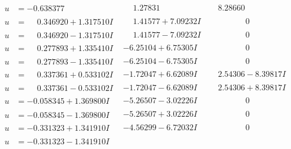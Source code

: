 \documentclass[1p]{elsarticle_modified}
\theoremstyle{definition}
\begin{document}
$$\begin{array}{c|c|c}
 \hline 
\begin{aligned}
u &= -0.638377\phantom{ +0.000000I}\end{aligned}
 & \phantom{-}1.27831\phantom{ +0.000000I} & \phantom{-}8.28660\phantom{ +0.000000I} \\ \hline\begin{aligned}
u &= \phantom{-}0.346920 + 1.317510 I\end{aligned}
 & \phantom{-}1.41577 + 7.09232 I & \phantom{-0.000000 } 0 \\ \hline\begin{aligned}
u &= \phantom{-}0.346920 - 1.317510 I\end{aligned}
 & \phantom{-}1.41577 - 7.09232 I & \phantom{-0.000000 } 0 \\ \hline\begin{aligned}
u &= \phantom{-}0.277893 + 1.335410 I\end{aligned}
 & -6.25104 + 6.75305 I & \phantom{-0.000000 } 0 \\ \hline\begin{aligned}
u &= \phantom{-}0.277893 - 1.335410 I\end{aligned}
 & -6.25104 - 6.75305 I & \phantom{-0.000000 } 0 \\ \hline\begin{aligned}
u &= \phantom{-}0.337361 + 0.533102 I\end{aligned}
 & -1.72047 + 6.62089 I & \phantom{-}2.54306 - 8.39817 I \\ \hline\begin{aligned}
u &= \phantom{-}0.337361 - 0.533102 I\end{aligned}
 & -1.72047 - 6.62089 I & \phantom{-}2.54306 + 8.39817 I \\ \hline\begin{aligned}
u &= -0.058345 + 1.369800 I\end{aligned}
 & -5.26507 - 3.02226 I & \phantom{-0.000000 } 0 \\ \hline\begin{aligned}
u &= -0.058345 - 1.369800 I\end{aligned}
 & -5.26507 + 3.02226 I & \phantom{-0.000000 } 0 \\ \hline\begin{aligned}
u &= -0.331323 + 1.341910 I\end{aligned}
 & -4.56299 - 6.72032 I & \phantom{-0.000000 } 0 \\ \hline\begin{aligned}
u &= -0.331323 - 1.341910 I\end{aligned}

\end{array}$$
\end{document}
